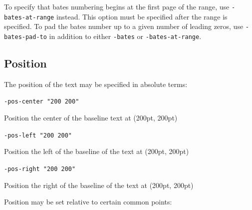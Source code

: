 \documentclass{book}
\begin{document}
\noindent To specify that bates numbering begins at the first page of the range, use \texttt{-bates-at-range} instead. This option must be specified after the range is specified. To pad the bates number up to a given number of leading zeros, use \texttt{-bates-pad-to} in addition to either \texttt{-bates} or \texttt{-bates-at-range}.



  \subsection{Position}
  \label{position}
  The position of the text may be specified in absolute terms:
  \begin{framed}
    \noindent\small\verb!-pos-center "200 200"!
  
    \vspace{2.5mm}
    \noindent Position the center of the baseline text at (200pt, 200pt)

    \vspace{2.5mm}
    \noindent\small\verb!-pos-left "200 200"!
  
    \vspace{2.5mm}
    \noindent Position the left of the baseline of the text at (200pt, 200pt)

    \vspace{2.5mm}
    \noindent\small\verb!-pos-right "200 200"!
  
    \vspace{2.5mm}
    \noindent Position the right of the baseline of the text at (200pt, 200pt)

  \end{framed}

  \noindent Position may be set relative to certain common points:
\end{document}
